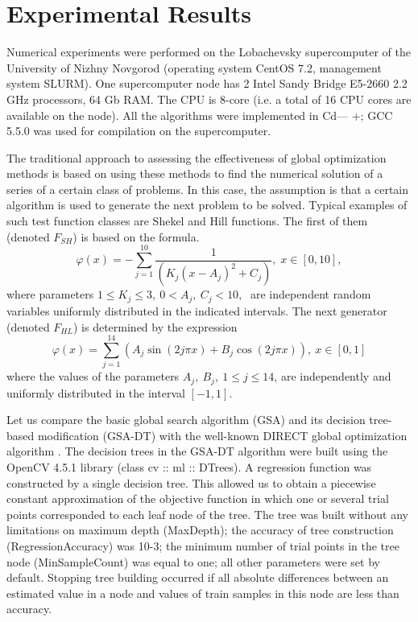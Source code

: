 \documentclass[entropy,article,submit,moreauthors,pdftex]{Definitions/mdpi}
\begin{document}
\section{Experimental Results}

Numerical experiments were performed on the Lobachevsky supercomputer of the University of Nizhny Novgorod (operating system CentOS 7.2, management system SLURM). One supercomputer node has 2 Intel Sandy Bridge E5-2660 2.2 GHz processors, 64 Gb RAM. The CPU is 8-core (i.e. a total of 16 CPU cores are available on the node). All the algorithms were implemented in Cd— +; GCC 5.5.0 was used for compilation on the supercomputer.

The traditional approach to assessing the effectiveness of global optimization methods is based on using these methods to find the numerical solution of a series of a certain class of problems. 
In this case, the assumption is that a certain algorithm is used to generate the next problem to be solved. 
Typical examples of such test function classes are Shekel and Hill functions. 
The first of them (denoted $F_{SH}$) is based on the formula.
\begin{equation}\label{shekel}
  \varphi(x)=-\sum_{j=1}^{10}\frac{1}{(K_j(x-A_j)^2+C_j)},\;  x\in[0,10],
\end{equation}
where parameters $1\le K_j\le 3,\: 0 < A_j,\: C_j < 10, \;$ are independent random variables uniformly distributed in the indicated intervals. 
The next generator (denoted   $F_{HL}$) is determined by the expression
\begin{equation}\label{hill}
  \varphi(x)=\sum_{j=1}^{14}(A_j\sin(2j\pi x) + B_j\cos(2j\pi x)),\: x\in[0,1]
\end{equation}
where the values of the parameters $A_j,\: B_j,\: 1 \le j \le 14$, are independently and uniformly distributed in the interval  $[-1,1]$. 

Let us compare the basic global search algorithm (GSA) and its decision tree-based modification (GSA-DT) with the well-known DIRECT global optimization algorithm  \cite{Jones2009}.  
The decision trees in the GSA-DT algorithm were built using the OpenCV 4.5.1 library (class cv :: ml :: DTrees). A regression function was constructed by a single decision tree. This allowed us to obtain a piecewise constant approximation of the objective function in which one or several trial points corresponded to each leaf node of the tree. 
The tree was built without any limitations on maximum depth (MaxDepth); the accuracy of tree construction (RegressionAccuracy) was 10-3; the minimum number of trial points in the tree node (MinSampleCount) was equal to one; all other parameters were set by default. Stopping tree building occurred if all absolute differences between an estimated value in a node and values of train samples in this node are less than accuracy.
\end{document}
